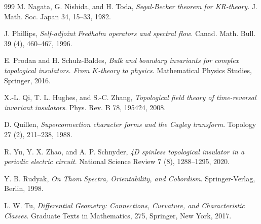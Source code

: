 \documentclass{amsart}
\theoremstyle{definition}
\theoremstyle{remark}
\begin{document}
\begin{thebibliography}{999}
M. Nagata, G. Nishida, and H. Toda,
\textit{Segal-Becker theorem for KR-theory}.
J. Math. Soc. Japan 34, 15--33, 1982.

J. Phillips,
\textit{Self-adjoint Fredholm operators and spectral flow}.
Canad. Math. Bull. 39 (4), 460--467, 1996.

E. Prodan and H. Schulz-Baldes,
\textit{Bulk and boundary invariants for complex topological insulators. From $K$-theory to physics}.
Mathematical Physics Studies, Springer, 2016.

X.-L. Qi, T. L. Hughes, and S.-C. Zhang,
\textit{Topological field theory of time-reversal invariant insulators}.
Phys. Rev. B 78, 195424, 2008.

D. Quillen,
\textit{Superconnection character forms and the Cayley transform}.
Topology 27 (2), 211--238, 1988.

R. Yu, Y. X. Zhao, and A. P. Schnyder,
\textit{4D spinless topological insulator in a periodic electric circuit}.
National Science Review 7 (8), 1288--1295, 2020.

Y. B. Rudyak,
\textit{On Thom Spectra, Orientability, and Cobordism}.
Springer-Verlag, Berlin, 1998.

L. W. Tu,
\textit{Differential Geometry: Connections, Curvature, and Characteristic Classes}.
Graduate Texts in Mathematics, 275, Springer, New York, 2017.

\end{thebibliography}
\end{document}
